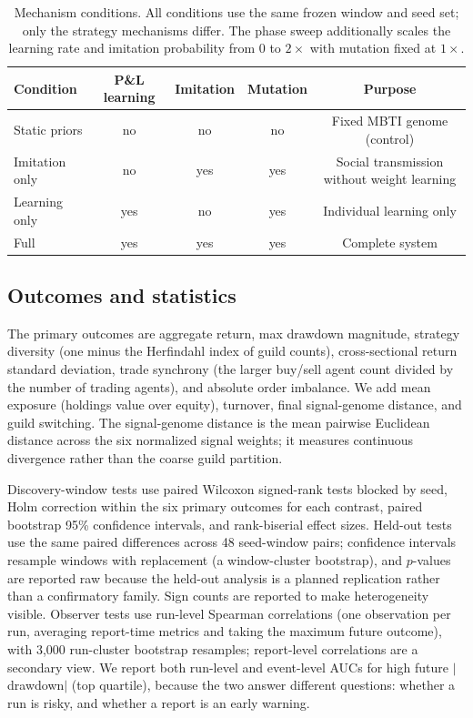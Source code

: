 \documentclass[11pt]{article}
\begin{document}
\begin{table}[t]
  \centering
  \small
  \caption{Mechanism conditions. All conditions use the same frozen window and
  seed set; only the strategy mechanisms differ. The phase sweep additionally
  scales the learning rate and imitation probability from $0$ to $2\times$ with
  mutation fixed at $1\times$.}
  \label{tab:conditions}
  \begin{tabular}{lcccc}
    \toprule
    Condition & P\&L learning & Imitation & Mutation & Purpose\\
    \midrule
    Static priors & no & no & no & Fixed MBTI genome (control)\\
    Imitation only & no & yes & yes & Social transmission without weight learning\\
    Learning only & yes & no & yes & Individual learning only\\
    Full & yes & yes & yes & Complete system\\
    \bottomrule
  \end{tabular}
\end{table}

\subsection{Outcomes and statistics}

The primary outcomes are aggregate return, max drawdown magnitude, strategy
diversity (one minus the Herfindahl index of guild counts), cross-sectional
return standard deviation, trade synchrony (the larger buy/sell agent count
divided by the number of trading agents), and absolute order imbalance. We add
mean exposure (holdings value over equity), turnover, final signal-genome
distance, and guild switching. The signal-genome distance is the mean pairwise
Euclidean distance across the six normalized signal weights; it measures
continuous divergence rather than the coarse guild partition.

Discovery-window tests use paired Wilcoxon signed-rank tests blocked by seed,
Holm correction within the six primary outcomes for each contrast, paired
bootstrap 95\% confidence intervals, and rank-biserial effect sizes. Held-out
tests use the same paired differences across 48 seed-window pairs; confidence
intervals resample windows with replacement (a window-cluster bootstrap), and
$p$-values are reported raw because the held-out analysis is a planned
replication rather than a confirmatory family. Sign counts are reported to make
heterogeneity visible. Observer tests use run-level Spearman correlations
(one observation per run, averaging report-time metrics and taking the maximum
future outcome), with 3,000 run-cluster bootstrap resamples; report-level
correlations are a secondary view. We report both run-level and event-level AUCs
for high future $|$drawdown$|$ (top quartile), because the two answer different
questions: whether a run is risky, and whether a report is an early warning.
\end{document}
